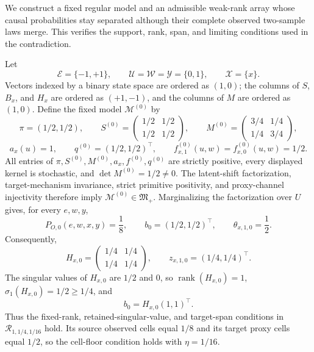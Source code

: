 We construct a fixed regular model and an admissible weak-rank array whose causal probabilities stay separated although their complete observed two-sample laws merge.  This verifies the support, rank, span, and limiting conditions used in the contradiction.

Let
\[
\mathcal E=\{-1,+1\},\qquad
\mathcal U=\mathcal W=\mathcal Y=\{0,1\},\qquad
\mathcal X=\{x\}.
\]
Vectors indexed by a binary state space are ordered as \((1,0)\); the columns of \(S\), \(B_x\), and \(H_x\) are ordered as \((+1,-1)\), and the columns of \(M\) are ordered as \((1,0)\).  Define the fixed model \(\mathcal M^{(0)}\) by
\[
\pi=(1/2,1/2),\qquad
S^{(0)}=
\begin{pmatrix}1/2&1/2\\1/2&1/2\end{pmatrix},\qquad
M^{(0)}=
\begin{pmatrix}3/4&1/4\\1/4&3/4\end{pmatrix},
\]
\[
a_x(u)=1,\qquad q^{(0)}=(1/2,1/2)^{\top},\qquad
f^{(0)}_{x,1}(u,w)=f^{(0)}_{x,0}(u,w)=1/2.
\]
All entries of \(\pi,S^{(0)},M^{(0)},a_x,f^{(0)},q^{(0)}\) are strictly positive, every displayed kernel is stochastic, and \(\det M^{(0)}=1/2\ne0\).  The latent-shift factorization, target-mechanism invariance, strict primitive positivity, and proxy-channel injectivity therefore imply \(\mathcal M^{(0)}\in\mathfrak M_{+}\).  Marginalizing the factorization over \(U\) gives, for every \(e,w,y\),
\[
P_{O,0}(e,w,x,y)=\frac18,\qquad
b_0=(1/2,1/2)^{\top},\qquad
\theta_{x,1,0}=\frac12.
\]
Consequently,
\[
H_{x,0}=
\begin{pmatrix}1/4&1/4\\1/4&1/4\end{pmatrix},
\qquad z_{x,1,0}=(1/4,1/4)^{\top}.
\]
The singular values of \(H_{x,0}\) are \(1/2\) and \(0\), so \(\operatorname{rank}(H_{x,0})=1\), \(\sigma_1(H_{x,0})=1/2\ge1/4\), and
\[
b_0=H_{x,0}(1,1)^{\top}.
\]
Thus the fixed-rank, retained-singular-value, and target-span conditions in \(\mathcal R_{1,1/4,1/16}\) hold.  Its source observed cells equal \(1/8\) and its target proxy cells equal \(1/2\), so the cell-floor condition holds with \(\eta=1/16\).

